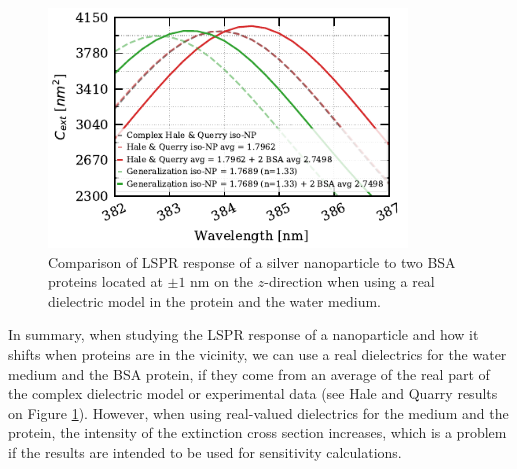  \begin{figure} %
    \centering
    \includegraphics[width=0.85\textwidth]{bsa_phan_avg_real_water_diel.pdf} 
    \caption{Comparison of LSPR response of a silver nanoparticle to two BSA proteins located at $\pm1$ nm on the $z$-direction
    when using a real dielectric model in the protein and the water medium.}
    \label{fig:bsa_w_real}
 \end{figure}

In summary, when studying the LSPR response of a nanoparticle and how it shifts when proteins are in the vicinity, we can use 
a real dielectrics for the water medium and the BSA protein, if they come from an average of the real part of the complex dielectric model 
or experimental data (see Hale and Quarry results on Figure \ref{fig:bsa_w_real}). However, when using real-valued dielectrics for the medium 
and the protein, the intensity of the extinction cross section increases, which is a problem if the results are intended to be used for 
sensitivity calculations. 
